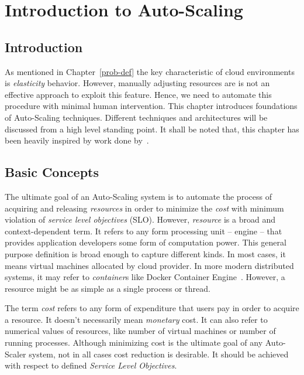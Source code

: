 \chapter{Introduction to Auto-Scaling}
\label{intro-auto-scale}

\section{Introduction}
\label{ias:intro}

As mentioned in Chapter~\ref{prob-def} the key characteristic of cloud environments is \emph{elasticity} behavior. However, manually adjusting resources are is not an effective approach to exploit this feature. Hence, we need to automate this procedure with minimal human intervention. This chapter introduces foundations of Auto-Scaling techniques. Different techniques and architectures will be discussed from a high level standing point. It shall be noted that, this chapter has been heavily inspired by work done by~\textcite{Lorido-Botran2014}.

\section{Basic Concepts}
\label{ias:basics}

The ultimate goal of an Auto-Scaling system is to automate the process of acquiring and releasing \emph{resources} in order to minimize the \emph{cost} with minimum violation of \emph{service level objectives} (SLO). However, \emph{resource} is a broad and context-dependent term. It refers to any form processing unit -- engine -- that provides application developers some form of computation power. This general purpose definition is broad enough to capture different kinds. In most cases, it means virtual machines allocated by cloud provider. In more modern distributed systems, it may refer to \emph{container}s like Docker Container Engine~\cite{docker}. However, a resource might be as simple as a single process or thread.

The term \emph{cost} refers to any form of expenditure that users pay in order to acquire a resource. It doesn't necessarily mean \emph{monetary} cost. It can also refer to numerical values of resources, like number of virtual machines or number of running processes. Although minimizing cost is the ultimate goal of any Auto-Scaler system, not in all cases cost reduction is desirable. It should be achieved with respect to defined \emph{Service Level Objectives}.

